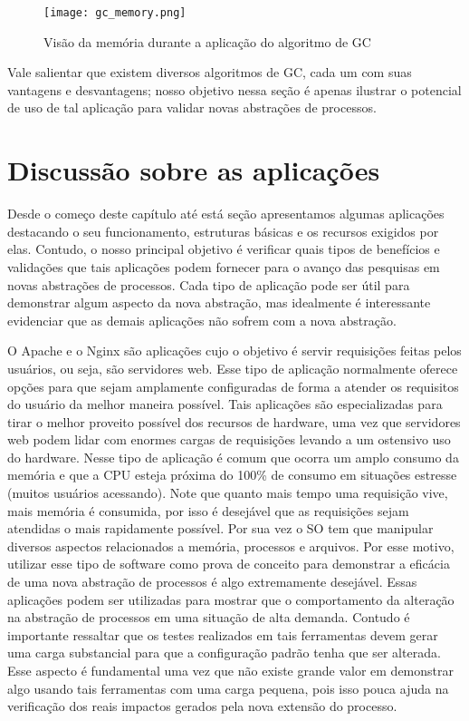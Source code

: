 \begin{figure}[!h]
  \centering
  \texttt{[image: gc\_memory.png]}
  \caption{Visão da memória durante a aplicação do algoritmo de GC\citep{gc_basics}}
  \label{fig:gc_mem}
\end{figure}

Vale salientar que existem diversos algoritmos de GC, cada um com suas
vantagens e desvantagens; nosso objetivo nessa seção é apenas ilustrar o
potencial de uso de tal aplicação para validar novas abstrações de processos.

\section{Discussão sobre as aplicações}

Desde o começo deste capítulo até está seção apresentamos algumas aplicações
destacando o seu funcionamento, estruturas básicas e os recursos exigidos por
elas. Contudo, o nosso principal objetivo é verificar quais tipos de benefícios
e validações que tais aplicações podem fornecer para o avanço das pesquisas em
novas abstrações de processos. Cada tipo de aplicação pode ser útil para
demonstrar algum aspecto da nova abstração, mas idealmente é interessante
evidenciar que as demais aplicações não sofrem com a nova abstração.

O Apache e o Nginx são aplicações cujo o objetivo é servir requisições feitas
pelos usuários, ou seja, são servidores web. Esse tipo de aplicação normalmente
oferece opções para que sejam amplamente configuradas de forma a atender os
requisitos do usuário da melhor maneira possível. Tais aplicações são
especializadas para tirar o melhor proveito possível dos recursos de hardware,
uma vez que servidores web podem lidar com enormes cargas de requisições
levando a um ostensivo uso do hardware. Nesse tipo de aplicação é comum que
ocorra um amplo consumo da memória e que a CPU esteja próxima do 100\% de
consumo em situações estresse (muitos usuários acessando).  Note que quanto
mais tempo uma requisição vive, mais memória é consumida, por isso é desejável
que as requisições sejam atendidas o mais rapidamente possível. Por sua vez o
SO tem que manipular diversos aspectos relacionados a memória, processos e
arquivos. Por esse motivo, utilizar esse tipo de software como prova de
conceito para demonstrar a eficácia de uma nova abstração de processos é algo
extremamente desejável. Essas aplicações podem ser utilizadas para mostrar que
o comportamento da alteração na abstração de processos em uma situação de alta
demanda.  Contudo é importante ressaltar que os testes realizados em tais
ferramentas devem gerar uma carga substancial para que a configuração padrão
tenha que ser alterada. Esse aspecto é fundamental uma vez que não existe
grande valor em demonstrar algo usando tais ferramentas com uma carga pequena,
pois isso pouca ajuda na verificação dos reais impactos gerados pela nova
extensão do processo.

